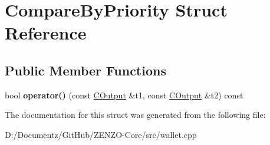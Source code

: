 \hypertarget{struct_compare_by_priority}{}\section{Compare\+By\+Priority Struct Reference}
\label{struct_compare_by_priority}
\subsection*{Public Member Functions}
\begin{DoxyCompactItemize}
\item 
\mbox{\label{struct_compare_by_priority_a880b81d741c9616f12799ff73becf4e3}} 
bool {\bfseries operator()} (const \mbox{\hyperlink{class_c_output}{C\+Output}} \&t1, const \mbox{\hyperlink{class_c_output}{C\+Output}} \&t2) const
\end{DoxyCompactItemize}


The documentation for this struct was generated from the following file\+:\begin{DoxyCompactItemize}
\item 
D\+:/\+Documentz/\+Git\+Hub/\+Z\+E\+N\+Z\+O-\/\+Core/src/wallet.\+cpp\end{DoxyCompactItemize}
